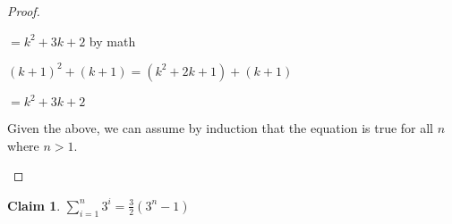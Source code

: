\documentclass{article}
\newtheorem{claim}{Claim}
\begin{document}
\begin{proof}
\begin{enumerate}
          \hspace{1cm}$= k^2 + 3k + 2$
          \hspace{2.15cm} by math
          
          \vspace{0.5cm}

          $(k+1)^2 + (k+1) = (k^2 + 2k + 1) + (k + 1)$ 

          \hspace{1cm}$= k^2 + 3k + 2$
          \vspace{.5cm}

        Given the above, we can assume by induction that the equation is 
        true for all $n$ where $n>1$.
        \end{enumerate}
        
      \end{proof}

    \begin{claim}
      $\sum\limits_{i=1}^{n} 3^i = \frac{3}{2} (3^n-1)$
      \vspace{.5cm}
    \end{claim}
\end{document}
